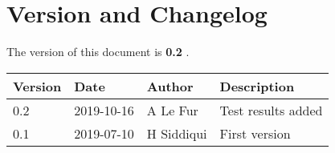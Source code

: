 \section{Version and Changelog}

The version of this document is {\bf 0.2} .

\begin{table}[H]
    \begin{tabular}{|l|l|l|p{10cm}| }
    \hline
    {\bf Version} & {\bf Date} & {\bf Author} & {\bf Description} \\ \hline
    0.2 & 2019-10-16 & A Le Fur & Test results added \\ \hline
    0.1 & 2019-07-10 & H Siddiqui & First version \\ \hline
    \end{tabular}
\end{table}
